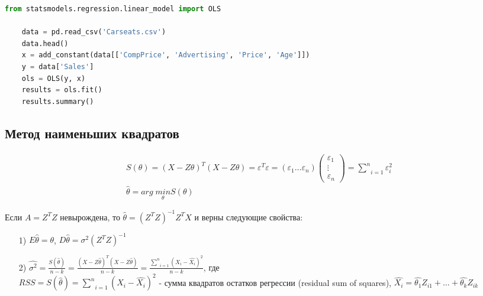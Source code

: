 \begin{lstlisting}[language=Python]
	from statsmodels.regression.linear_model import OLS

	data = pd.read_csv('Carseats.csv')
	data.head()
	x = add_constant(data[['CompPrice', 'Advertising', 'Price', 'Age']])
	y = data['Sales'] 
	ols = OLS(y, x)
	results = ols.fit()
	results.summary()
\end{lstlisting}

\subsection{Метод наименьших квадратов}\label{cha:linreg/sec:basic/subsec:theory/subsubsec:mse}


$$\begin{gathered}
	S(\theta) = \left( X - Z \theta \right)^T\left( X - Z \theta \right) = \varepsilon^T \varepsilon = (\varepsilon_1 \dots \varepsilon_n)
	\begin{pmatrix}
		\varepsilon_1 \\ \vdots \\ \varepsilon_n
	\end{pmatrix} = \underset{i=1}{\overset{n}{\sum}}\varepsilon_i^2 \\
	\hat{\theta} = arg \; \underset{\theta}{min} S(\theta)
\end{gathered}$$

\begin{theorem}[]\label{lec:linreg/the:1}
	Если $A = Z^T Z$ невырождена, то $\displaystyle \hat{\theta} = \left( Z^T Z \right)^{-1} Z^T X$ и верны следующие свойства:
	\begin{itemize}
		\item[1)] $E \hat{\theta} = \theta$, $D \hat{\theta} = \sigma^2 \left( Z^T Z \right)^{-1}$
		\item[2)] $\displaystyle \hat{\sigma^2} = \frac{S(\hat{\theta})}{n-k} = \frac{\left( X - Z \hat{\theta} \right)^T\left( X - Z \hat{\theta} \right)}{n-k} = \frac{\underset{i=1}{\overset{n}{\sum}}\left( X_i - \hat{X_i} \right)^2}{n-k}$, где \\ $RSS = S(\hat{\theta}) = \underset{i=1}{\overset{n}{\sum}}\left( X_i - \hat{X_i} \right)^2$ - сумма квадратов остатков регрессии (residual sum of squares), $\hat{X_i} = \hat{\theta_1} Z_{i1} + \dots + \hat{\theta_k} Z_{ik}$
	\end{itemize}
\end{theorem}

